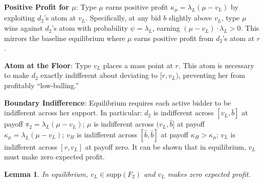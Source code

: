 \documentclass[11pt]{article}
\theoremstyle{plain}
\theoremstyle{definition}
\theoremstyle{plain}
\theoremstyle{plain}
\theoremstyle{plain}
\newtheorem{lem}[thm]{Lemma}
\theoremstyle{plain}
\numberwithin{equation}{section}
\begin{document}
\item \textbf{Positive Profit for $\mu$}: Type $\mu$ earns positive profit $\kappa_{\mu} = \lambda_L(\mu - v_L)$ by exploiting $d_2$'s atom at $v_L$. Specifically, at any bid $b$ slightly above $v_L$, type $\mu$ wins against $d_2$'s atom with probability $\psi = \lambda_L$, earning $(\mu - v_L) \cdot \lambda_L > 0$. This mirrors the baseline equilibrium where $\mu$ earns positive profit from $d_2$'s atom at $r$.

\item \textbf{Atom at the Floor}: Type $v_L$ places a mass point at $r$. This atom is necessary to make $d_2$ exactly indifferent about deviating to $[r, v_L)$, preventing her from profitably ``low-balling.''

\item \textbf{Boundary Indifference}: Equilibrium requires each active bidder to be indifferent across her support. In particular: $d_2$ is indifferent across $[v_L, \bar{b}]$ at payoff $\pi_2 = \lambda_L(\mu - v_L)$; $\mu$ is indifferent across $(v_L, \hat{b}]$ at payoff $\kappa_{\mu} = \lambda_L(\mu - v_L)$; $v_H$ is indifferent across $[\hat{b}, \bar{b}]$ at payoff $\kappa_H > \kappa_{\mu}$; $v_L$ is indifferent across $[r, v_L]$ at payoff zero.
\fi
\noindent It can be shown that in equilibrium, $v_L$ must make zero expected profit.

\begin{lem}\label{lem:nonbinding-zero-profit}
In equilibrium, $v_L \in \text{supp}(F_2)$ and $v_L$ makes zero expected profit.
\end{lem}
\end{document}
